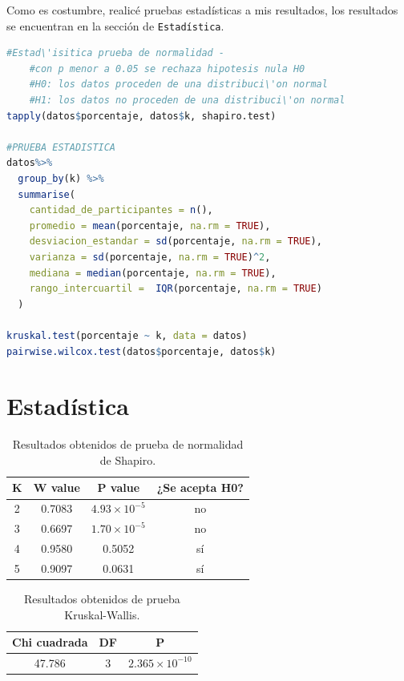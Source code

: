 \documentclass{article}
\begin{document}
Como es costumbre, realic\'e pruebas estad\'isticas a mis resultados, los resultados se encuentran en la secci\'on de \texttt{Estad\'istica}.
\begin{lstlisting}[language=R, caption= Segmento de c\'odigo pruebas estad\'isticas.]
#Estad\'isitica prueba de normalidad - 
    #con p menor a 0.05 se rechaza hipotesis nula H0
    #H0: los datos proceden de una distribuci\'on normal
    #H1: los datos no proceden de una distribuci\'on normal
tapply(datos$porcentaje, datos$k, shapiro.test)

#PRUEBA ESTADISTICA
datos%>%
  group_by(k) %>%
  summarise(
    cantidad_de_participantes = n(),
    promedio = mean(porcentaje, na.rm = TRUE),
    desviacion_estandar = sd(porcentaje, na.rm = TRUE),
    varianza = sd(porcentaje, na.rm = TRUE)^2,
    mediana = median(porcentaje, na.rm = TRUE),
    rango_intercuartil =  IQR(porcentaje, na.rm = TRUE)
  )

kruskal.test(porcentaje ~ k, data = datos)
pairwise.wilcox.test(datos$porcentaje, datos$k)
\end{lstlisting}




\section{Estad\'istica}
\begin{table}[ht]
    \centering
    \caption{Resultados obtenidos de prueba de normalidad de Shapiro.} 
    \begin{tabular}{|c|c|c|c|}
    \hline
    K & W value & P value & ¿Se acepta H0?  \\
    \hline
    2 & 0.7083 & $4.93\times 10^{-5}$ & no \\
    \hline 
    3 & 0.6697 & $1.70\times 10^{-5}$ & no  \\
    \hline 
    4 & 0.9580 & 0.5052 & s\'i \\
    \hline
    5 & 0.9097 & 0.0631 & s\'i \\
    \hline 
\end{tabular}
    \label{cuadro 1}
\end{table}

\begin{table}[ht]
    \centering
    \caption{Resultados obtenidos de prueba Kruskal-Wallis.} 
    \begin{tabular}{|c|c|c|}
    \hline
    Chi cuadrada & DF & P  \\
    \hline
    47.786 & 3 & $2.365\times 10^{-10}$ \\
    \hline
\end{tabular}
    \label{cuadro 2}
\end{table}
\end{document}
